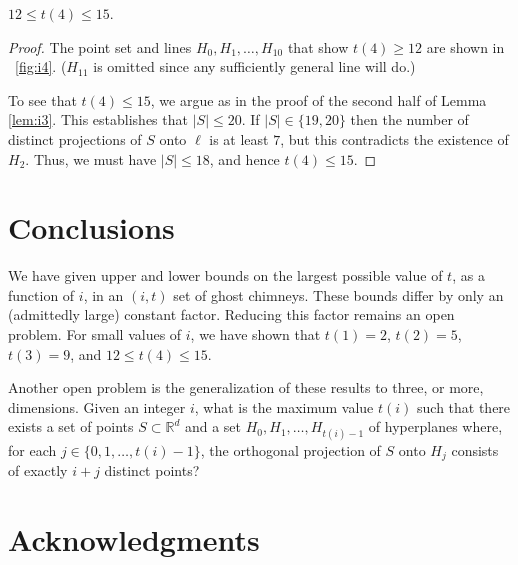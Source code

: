 \documentclass{ws-ijcga}
\newcommand{\R}{\mathbb{R}}
\begin{document}
\begin{lemma}\label{lem:lower-bound-4}
$12 \le t(4) \le 15$.
\end{lemma}

\begin{proof}
The point set and lines $H_0,H_1,\ldots,H_{10}$ that show $t(4)\ge 12$
are shown in \figurename~\ref{fig:i4}.  ($H_{11}$ is omitted since any sufficiently
general line will do.)

To see that $t(4) \le 15$, we argue as in the proof of the second half
of Lemma \ref{lem:i3}.  This establishes that $|S|\le 20$.  If $|S|\in\{19,20\}$
then the number of distinct projections of $S$ onto $\ell$ is at least $7$,
but this contradicts the existence of $H_2$.  
Thus, we must have $|S|\le 18$, and hence $t(4)\le 15$.
\end{proof}


\section{Conclusions}

We have given upper and lower bounds on the largest possible value of $t$,
as a function of $i$, in an $(i,t)$ set of ghost chimneys.
These bounds differ by only an (admittedly large) constant factor.
Reducing this factor remains an open problem.
For small values of $i$, we have shown that $t(1)=2$, $t(2)=5$,
$t(3)=9$, and $12 \leq t(4) \leq 15$.

Another open problem is the generalization of these results to three,
or more, dimensions.  Given an integer $i$, what is the maximum
value $t(i)$ such that there exists a set of points $S\subset\R^d$
and a set $H_0,H_1,\ldots,H_{t(i)-1}$ of hyperplanes where, for each
$j\in\{0,1,\ldots,t(i)-1\}$, the orthogonal projection of $S$ onto $H_j$
consists of exactly $i+j$ distinct points?


\section*{Acknowledgments}
\end{document}
